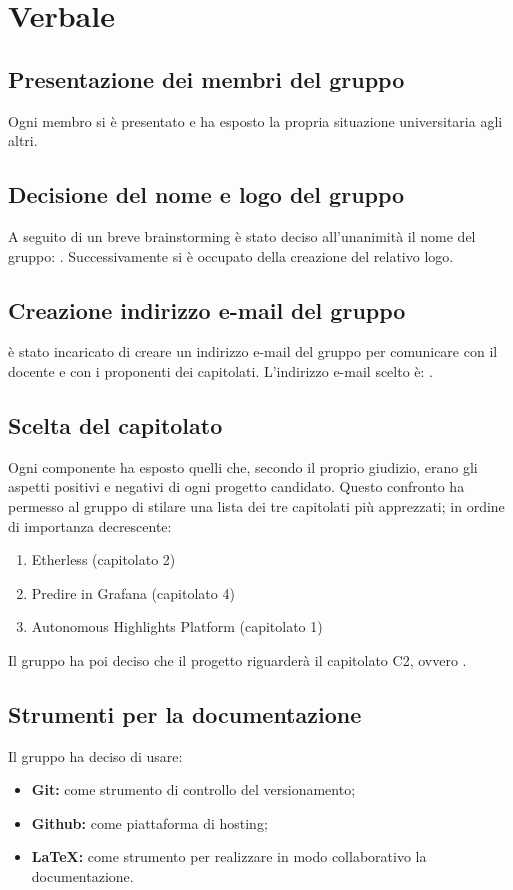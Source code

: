 \section{Verbale}
\subsection{Presentazione dei membri del gruppo}
Ogni membro si è presentato e ha esposto la propria situazione universitaria agli altri. 

\subsection{Decisione del nome e logo del gruppo}
A seguito di un breve brainstorming è stato deciso all'unanimità il nome del gruppo: \Gruppo.  Successivamente \AZ{} si è occupato della creazione del relativo logo. 

\subsection{Creazione indirizzo e-mail del gruppo}
\AZ{} è stato incaricato di creare un indirizzo e-mail del gruppo per comunicare con il docente e con i proponenti dei capitolati. 
L'indirizzo e-mail scelto è: \Mail.

\subsection{Scelta del capitolato}
Ogni componente ha esposto quelli che, secondo il proprio giudizio, erano gli aspetti positivi e negativi di ogni progetto candidato. Questo confronto ha permesso al gruppo di stilare una lista dei tre capitolati più apprezzati; in ordine di importanza decrescente: 
\begin{enumerate}
	\item Etherless (capitolato 2)
	\item Predire in Grafana (capitolato 4)
	\item Autonomous Highlights Platform (capitolato 1)
\end{enumerate}
Il gruppo ha poi deciso che il progetto riguarderà il capitolato C2, ovvero \NomeProgetto. 

\subsection{Strumenti per la documentazione} 
Il gruppo ha deciso di usare: 
\begin{itemize}
	\item \textbf{Git: } come strumento di controllo del versionamento; 
	\item \textbf{Github: } come piattaforma di hosting; 
	\item \textbf{\LaTeX: } come strumento per realizzare in modo collaborativo la documentazione. 
\end{itemize}

